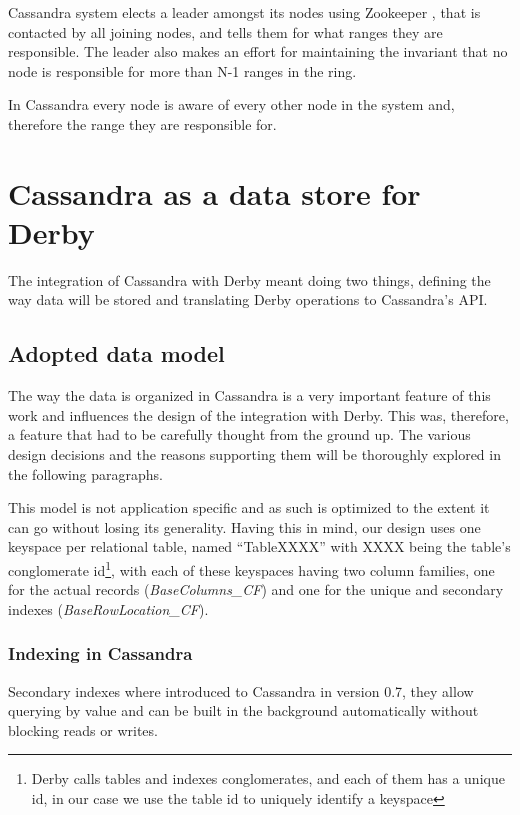 Cassandra system elects a leader amongst its nodes using Zookeeper \cite{Junqueira2007}, that is contacted by all joining nodes, and tells them for what ranges they are responsible. The leader also makes an effort for maintaining the invariant that no node is responsible for more than N-1 ranges in the ring. 

In Cassandra every node is aware of every other node in the system and, therefore the range they are responsible for.


\section{Cassandra as a data store for Derby}

The integration of Cassandra with Derby meant doing two things, defining the way data will be stored and translating Derby operations to Cassandra's API. 

\subsection{Adopted data model}
\label{sec:data_model}
The way the data is organized in Cassandra is a very important feature of this work and influences the design of the integration with Derby. This was, therefore, a feature that had to be carefully thought from the ground up. The various design decisions and the reasons supporting them will be thoroughly explored in the following paragraphs.

This model is not application specific and as such is optimized to the extent it can go without losing its generality. Having this in mind, our design uses one keyspace per relational table, named ``TableXXXX'' with XXXX being the table's conglomerate id\footnote{Derby calls tables and indexes conglomerates, and each of them has a unique id, in our case we use the table id to uniquely identify a keyspace}, with each of these keyspaces having two column families, one for the actual records (\emph{BaseColumns\_CF}) and one for the unique and secondary indexes (\emph{BaseRowLocation\_CF}).

\subsubsection{Indexing in Cassandra}
Secondary indexes where introduced to Cassandra in version 0.7, they allow querying by value and can be built in the background automatically without blocking reads or writes. 

